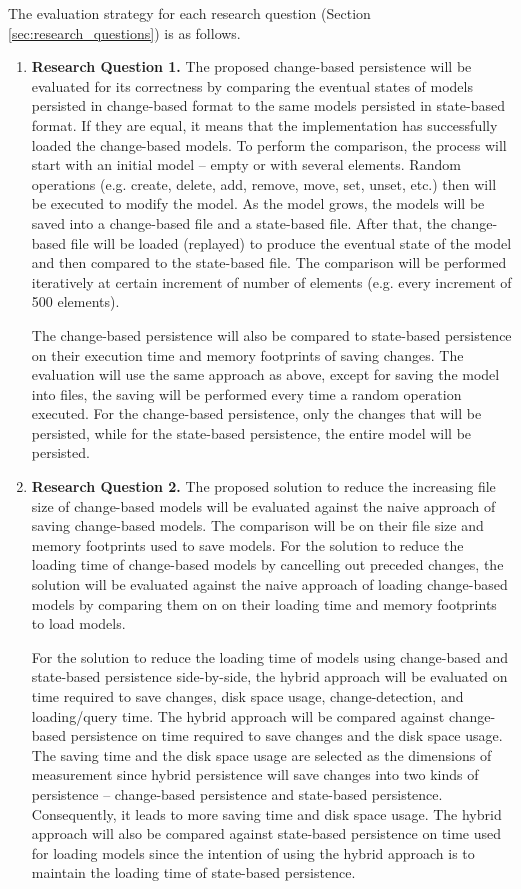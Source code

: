 \documentclass[12pt, a4paper]{report} \usepackage[titletoc]{appendix}
\begin{document}
The evaluation strategy for each research question (Section \ref{sec:research_questions}) is as follows. 
\begin{enumerate}
    \item \textbf{Research Question 1.} The proposed change-based persistence will be evaluated for its correctness by comparing the eventual states of models persisted in change-based format to the same models persisted in state-based format. If they are equal, it means that the implementation has successfully loaded the change-based models. To perform the comparison, the process will start with an initial model -- empty or with several elements. Random operations (e.g. create, delete, add, remove, move, set, unset, etc.) then will be executed to modify the model. As the model grows, the models will be saved into a change-based file and a state-based file. After that, the change-based file will be loaded (replayed) to produce the eventual state of the model and then compared to the state-based file. The comparison will be performed iteratively at certain increment of number of elements (e.g. every increment of 500 elements). 
    
    The change-based persistence will also be compared to state-based persistence on their execution time and memory footprints of saving changes. The evaluation will use the same approach as above, except for saving the model into files, the saving will be performed every time a random operation executed. For the change-based persistence, only the changes that will be persisted, while for the state-based persistence, the entire model will be persisted.
    
    \item \textbf{Research Question 2.} The proposed solution to reduce the increasing file size of change-based models will be evaluated against the naive approach of saving change-based models. The comparison will be on their file size and memory footprints used to save models. For the solution to reduce the loading time of change-based models by cancelling out preceded changes, the solution will be evaluated against the naive approach of loading change-based models by comparing them on on their loading time and memory footprints to load models.  
    
     For the solution to reduce the loading time of models using change-based and state-based persistence side-by-side,  the hybrid approach will be evaluated on time required to save changes, disk space usage, change-detection, and loading/query time. The hybrid approach will be compared against change-based persistence on time required to save changes and the disk space usage. The saving time and the disk space usage are selected as the dimensions of measurement since hybrid persistence will save changes into two kinds of persistence -- change-based persistence and state-based persistence. Consequently, it leads to more saving time and disk space usage. The hybrid approach will also be compared against state-based persistence on time used for loading models since the intention of using the hybrid approach is to maintain the loading time of state-based persistence. 
    

\end{enumerate}
\end{document}
